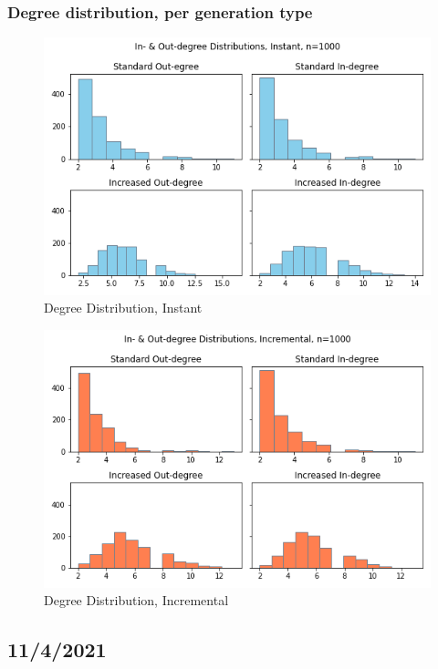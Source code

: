 \documentclass{article}
\begin{document}
\subsubsection{Degree distribution, per generation type}

\begin{center}
    \begin{figure}[!htbp]
        \centering
        \includegraphics[width=.8\textwidth]{ThesisKI/Images/InstantDegree.png}
        \caption{Degree Distribution, Instant}
        \label{degree:instant}
    \end{figure}
\end{center}
\begin{center}
    \begin{figure}[!htbp]
        \centering
        \includegraphics[width=.8\textwidth]{ThesisKI/Images/IncrementalDegree.png}
        \caption{Degree Distribution, Incremental}
        \label{degree:incremental}
    \end{figure}
\end{center}

\subsection{11/4/2021}
\end{document}
